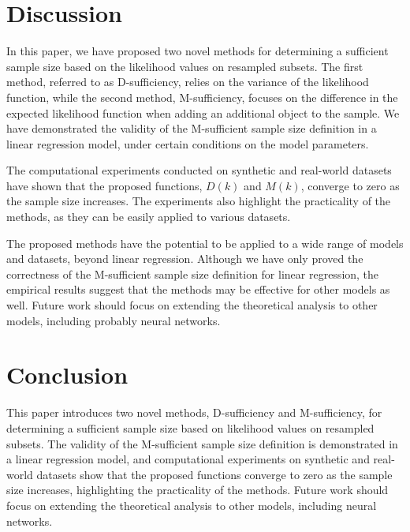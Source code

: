 \documentclass[runningheads]{llncs}
\begin{document}
\clearpage
\section{Discussion}

In this paper, we have proposed two novel methods for determining a sufficient sample size based on the likelihood values on resampled subsets. The first method, referred to as D-sufficiency, relies on the variance of the likelihood function, while the second method, M-sufficiency, focuses on the difference in the expected likelihood function when adding an additional object to the sample. We have demonstrated the validity of the M-sufficient sample size definition in a linear regression model, under certain conditions on the model parameters.

The computational experiments conducted on synthetic and real-world datasets have shown that the proposed functions, $D(k)$ and $M(k)$, converge to zero as the sample size increases. The experiments also highlight the practicality of the methods, as they can be easily applied to various datasets.

The proposed methods have the potential to be applied to a wide range of models and datasets, beyond linear regression. Although we have only proved the correctness of the M-sufficient sample size definition for linear regression, the empirical results suggest that the methods may be effective for other models as well. Future work should focus on extending the theoretical analysis to other models, including probably neural networks.

\section{Conclusion}

This paper introduces two novel methods, D-sufficiency and M-sufficiency, for determining a sufficient sample size based on likelihood values on resampled subsets. The validity of the M-sufficient sample size definition is demonstrated in a linear regression model, and computational experiments on synthetic and real-world datasets show that the proposed functions converge to zero as the sample size increases, highlighting the practicality of the methods. Future work should focus on extending the theoretical analysis to other models, including neural networks.

%
%
%
\clearpage


%
\end{document}
